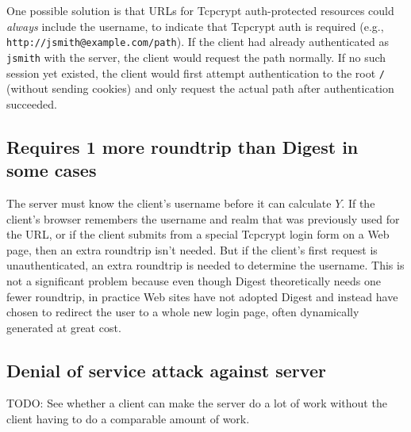 \documentclass[11pt]{article}
\begin{document}
One possible solution is that URLs for Tcpcrypt auth-protected resources could {\it always} include the username, to indicate that Tcpcrypt auth is required (e.g., {\tt http://jsmith@example.com/path}). If the client had already authenticated as {\tt jsmith} with the server, the client would request the path normally. If no such session yet existed, the client would first attempt authentication to the root {\tt /} (without sending cookies) and only request the actual path after authentication succeeded.

\subsection{Requires 1 more roundtrip than Digest in some cases}
The server must know the client's username before it can calculate $Y.$ If the client's browser remembers the username and realm that was previously used for the URL, or if the client submits from a special Tcpcrypt login form on a Web page, then an extra roundtrip isn't needed. But if the client's first request is unauthenticated, an extra roundtrip is needed to determine the username. This is not a significant problem because even though Digest theoretically needs one fewer roundtrip, in practice Web sites have not adopted Digest and instead have chosen to redirect the user to a whole new login page, often dynamically generated at great cost.

\subsection{Denial of service attack against server}
TODO: See whether a client can make the server do a lot of work without the client having to do a comparable amount of work.

\end{document}
